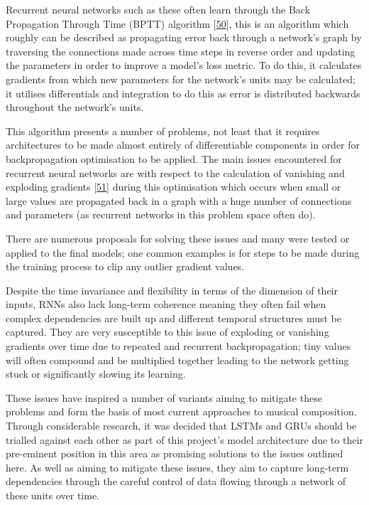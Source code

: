 \documentclass[12pt,]{article}
\begin{document}
Recurrent neural networks such as these often learn through the Back
Propagation Through Time (BPTT) algorithm
{[}\protect\hyperlink{ref-werbos1990backpropagation}{50}{]}, this is an
algorithm which roughly can be described as propagating error back
through a network's graph by traversing the connections made across time
steps in reverse order and updating the parameters in order to improve a
model's loss metric. To do this, it calculates gradients from which new
parameters for the network's units may be calculated; it utilises
differentials and integration to do this as error is distributed
backwards throughout the network's units.

This algorithm presents a number of problems, not least that it requires
architectures to be made almost entirely of differentiable components in
order for backpropagation optimisation to be applied. The main issues
encountered for recurrent neural networks are with respect to the
calculation of vanishing and exploding gradients
{[}\protect\hyperlink{ref-pascanu2012understanding}{51}{]} during this
optimisation which occurs when small or large values are propagated back
in a graph with a huge number of connections and parameters (as
recurrent networks in this problem space often do).

There are numerous proposals for solving these issues and many were
tested or applied to the final models; one common examples is for steps
to be made during the training process to clip any outlier gradient
values.

Despite the time invariance and flexibility in terms of the dimension of
their inputs, RNNs also lack long-term coherence meaning they often fail
when complex dependencies are built up and different temporal structures
must be captured. They are very susceptible to this issue of exploding
or vanishing gradients over time due to repeated and recurrent
backpropagation; tiny values will often compound and be multiplied
together leading to the network getting stuck or significantly slowing
its learning.

These issues have inspired a number of variants aiming to mitigate these
problems and form the basis of most current approaches to musical
composition. Through considerable research, it was decided that LSTMs
and GRUs should be trialled against each other as part of this project's
model architecture due to their pre-eminent position in this area as
promising solutions to the issues outlined here. As well as aiming to
mitigate these issues, they aim to capture long-term dependencies
through the careful control of data flowing through a network of these
units over time.
\end{document}
